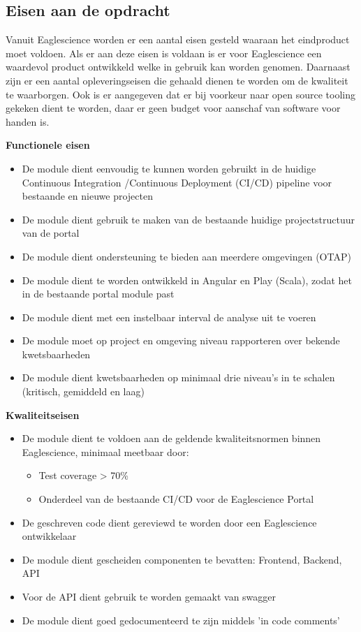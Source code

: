 \subsection{Eisen aan de opdracht}\label{subsec: eisen-aan-de-opdracht}
Vanuit Eaglescience worden er een aantal eisen gesteld waaraan het eindproduct moet voldoen. Als er aan deze eisen is voldaan is er voor Eaglescience een waardevol product ontwikkeld welke in gebruik kan worden genomen. Daarnaast zijn er een aantal opleveringseisen die gehaald dienen te worden om de kwaliteit te waarborgen. Ook is er aangegeven dat er bij voorkeur naar open source tooling  gekeken dient te worden, daar er geen budget voor aanschaf van software voor handen is.
\newpage

\textbf{Functionele eisen}
\begin{itemize}
\item De module dient eenvoudig te kunnen worden gebruikt in de huidige Continuous Integration /Continuous Deployment (CI/CD) pipeline voor bestaande en nieuwe projecten
\item De module dient gebruik te maken van de bestaande huidige projectstructuur van de portal
\item De module dient ondersteuning te bieden aan meerdere omgevingen (OTAP)
\item De module dient te worden ontwikkeld in Angular en Play (Scala), zodat het in de bestaande portal module past
\item De module dient met een instelbaar interval de analyse uit te voeren
\item De module moet op project en omgeving niveau rapporteren over bekende kwetsbaarheden
\item De module dient kwetsbaarheden op minimaal drie niveau’s in te schalen (kritisch, gemiddeld en laag)
\end{itemize}
\textbf{Kwaliteitseisen}
\begin{itemize}
\item De module dient te voldoen aan de geldende kwaliteitsnormen binnen Eaglescience, minimaal meetbaar door:
	\begin{itemize}
	\item Test coverage > 70\%
	\item Onderdeel van de bestaande CI/CD voor de Eaglescience Portal
	\end{itemize}
\item De geschreven code dient gereviewd te worden door een Eaglescience ontwikkelaar
\item De module dient gescheiden componenten te bevatten: Frontend, Backend, API
\item Voor de API dient gebruik te worden gemaakt van swagger
\item De module dient goed gedocumenteerd te zijn middels 'in code comments'
\end{itemize}

